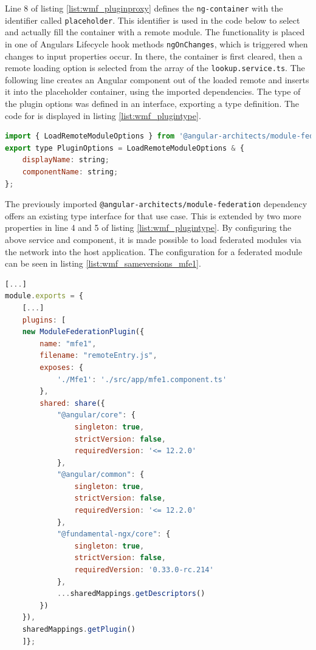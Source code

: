 Line 8 of listing \ref{list:wmf_pluginproxy} defines the \texttt{ng-container} with the identifier called \texttt{placeholder}. This identifier is used in the code below to select and actually fill the container with a remote module. The functionality is placed in one of Angulars Lifecycle hook methods \texttt{ngOnChanges}, which is triggered when changes to input properties occur.\cite{wmf_angular_lifecyclehooks} 
In there, the container is first cleared, then a remote loading option is selected from the array of the \texttt{lookup.service.ts}. The following line creates an Angular component out of the loaded remote and inserts it into the placeholder container, using the imported dependencies.
The type of the plugin options was defined in an interface, exporting a type definition. The code for is displayed in listing \ref{list:wmf_plugintype}.
\newpage
\begin{lstlisting}[language=JavaScript, caption=Content of \texttt{plugin.ts} for remote module loading in shell applications, label=list:wmf_plugintype,  xleftmargin=.01\textwidth, xrightmargin=.01\textwidth]
import { LoadRemoteModuleOptions } from '@angular-architects/module-federation';
export type PluginOptions = LoadRemoteModuleOptions & {
	displayName: string;
	componentName: string;
};
\end{lstlisting}

The previously imported \texttt{@angular-architects/module-federation} dependency offers an existing type interface for that use case. This is extended by two more properties in line 4 and 5 of listing \ref{list:wmf_plugintype}.
By configuring the above service and component, it is made possible to load federated modules via the network into the host application.
The configuration for a federated module can be seen in listing \ref{list:wmf_sameversions_mfe1}.

\begin{lstlisting}[language=JavaScript, caption=Content of \texttt{webpack.config.js} of the mfe1 remote app of the same versions WMF project, label=list:wmf_sameversions_mfe1,  xleftmargin=.01\textwidth, xrightmargin=.01\textwidth]
[...]
module.exports = {
	[...]
	plugins: [
	new ModuleFederationPlugin({
		name: "mfe1",
		filename: "remoteEntry.js",
		exposes: {
			'./Mfe1': './src/app/mfe1.component.ts'
		},
		shared: share({
			"@angular/core": { 
				singleton: true, 
				strictVersion: false, 
				requiredVersion: '<= 12.2.0' 
			},
			"@angular/common": { 
				singleton: true, 
				strictVersion: false, 
				requiredVersion: '<= 12.2.0' 
			},
			"@fundamental-ngx/core": { 
				singleton: true, 
				strictVersion: false,
				requiredVersion: '0.33.0-rc.214' 
			},
			...sharedMappings.getDescriptors()
		})
	}),
	sharedMappings.getPlugin()
	]};
\end{lstlisting}

